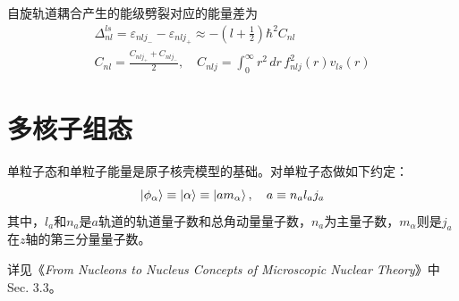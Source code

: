 自旋轨道耦合产生的能级劈裂对应的能量差为
\begin{align}
	\Delta_{nl}^{ls} = \varepsilon_{nlj_{-}} - \varepsilon_{nlj_{+}} \approx -(l + \frac{1}{2})\hbar^2 C_{nl} \\
	C_{nl} = \frac{C_{nlj_{+}} + C_{nlj_{-}}}{2},
	\quad
	C_{nlj} = \int_{0}^{\infty} r^2\, dr\, f_{nlj}^2(r) v_{ls}(r)
\end{align}

\section{多核子组态}
单粒子态和单粒子能量是原子核壳模型的基础。对单粒子态做如下约定：
\begin{equation}
	\ket{\phi_{\alpha}} \equiv \ket{\alpha} \equiv \ket{am_{\alpha}}, \quad a \equiv n_{a} l_{a} j_{a}
\end{equation}
其中，$l_a$和$n_a$是$a$轨道的轨道量子数和总角动量量子数，$n_a$为主量子数，$m_{\alpha}$则是$j_a$在$z$轴的第三分量量子数。

详见《\textit{From Nucleons to Nucleus Concepts of Microscopic Nuclear Theory}》中Sec. 3.3。

